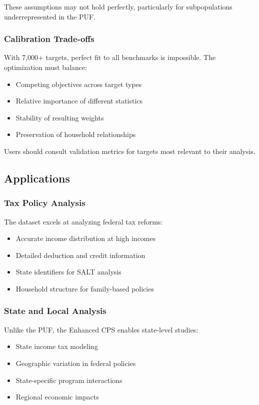These assumptions may not hold perfectly, particularly for subpopulations underrepresented in the PUF.

\subsubsection{Calibration Trade-offs}

With 7,000+ targets, perfect fit to all benchmarks is impossible. The optimization must balance:
\begin{itemize}
\item Competing objectives across target types
\item Relative importance of different statistics
\item Stability of resulting weights
\item Preservation of household relationships
\end{itemize}

Users should consult validation metrics for targets most relevant to their analysis.

\subsection{Applications}

\subsubsection{Tax Policy Analysis}

The dataset excels at analyzing federal tax reforms:
\begin{itemize}
\item Accurate income distribution at high incomes
\item Detailed deduction and credit information
\item State identifiers for SALT analysis
\item Household structure for family-based policies
\end{itemize}

\subsubsection{State and Local Analysis}

Unlike the PUF, the Enhanced CPS enables state-level studies:
\begin{itemize}
\item State income tax modeling
\item Geographic variation in federal policies
\item State-specific program interactions
\item Regional economic impacts
\end{itemize}

